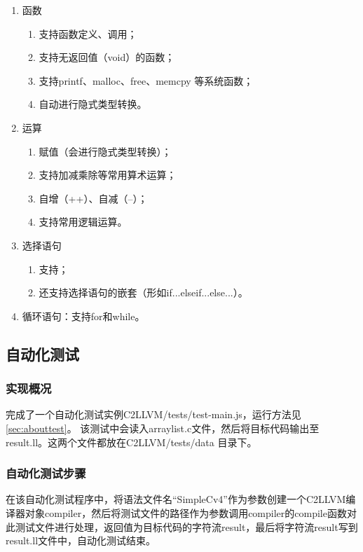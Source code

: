 \documentclass[a4paper]{article}
\begin{document}
\begin{CJK*}{UTF8}{gbsn}
\begin{enumerate}
        \item 函数
        \begin{enumerate}
            \item 支持函数定义、调用；
            \item 支持无返回值（void）的函数；
            \item 支持printf、malloc、free、memcpy 等系统函数；
            \item 自动进行隐式类型转换。
        \end{enumerate}

        \item 运算
        \begin{enumerate}
            \item 赋值（会进行隐式类型转换）；
            \item 支持加减乘除等常用算术运算；
            \item 自增（++）、自减（--）；
            \item 支持常用逻辑运算。
        \end{enumerate}

        \item 选择语句
        \begin{enumerate}
            \item 支持；
            \item 还支持选择语句的嵌套（形如if...else{if...else...}）。
        \end{enumerate}

        \item 循环语句：支持for和while。
    \end{enumerate}

    \subsection{自动化测试}
    \subsubsection{实现概况}
    完成了一个自动化测试实例C2LLVM/tests/test-main.js，运行方法见\ref{sec:abouttest}。 该测试中会读入arraylist.c文件，然后将目标代码输出至result.ll。这两个文件都放在C2LLVM/tests/data 目录下。

    \subsubsection{自动化测试步骤}
    在该自动化测试程序中，将语法文件名“SimpleCv4”作为参数创建一个C2LLVM编译器对象compiler，然后将测试文件的路径作为参数调用compiler的compile函数对此测试文件进行处理，返回值为目标代码的字符流result，最后将字符流result写到result.ll文件中，自动化测试结束。


\end{CJK*}
\end{document}
